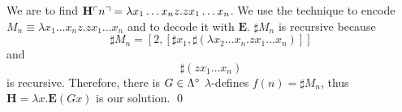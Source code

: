 \begin{pf} \rm
 We are to find $\mathbf{H}\ulcorner{n}\urcorner =
  \lambda x_1 \ldots x_n z. z x_1\ldots x_n$.
 We use the technique to encode $M_n\equiv \lambda x_1 \ldots x_n z. z x_1\ldots x_n$ 
 and to decode it with $\mathbf{E}$.
 $\sharp M_n$ is recursive because
 \[
  \sharp M_n = 
  [2, [\sharp x_1, \sharp( \lambda x_2 \ldots x_n. z x_1 \ldots x_n)]]
 \]
 and
 \[
  \sharp( z x_1 \ldots x_n )
 \]
 is recursive. Therefore, there is $G\in\Lambda^\circ$ $\lambda$-defines $f(n) = \sharp M_n$,
 thus $\mathbf{H} = \lambda x. \mathbf{E}(Gx)$ is our solution. \qed
\end{pf}
